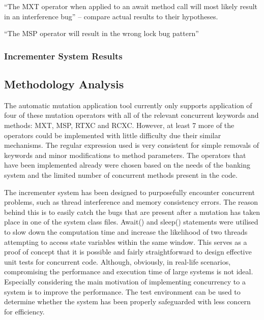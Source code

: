 \documentclass[a4paper,12pt]{article}
\begin{document}
“The MXT operator when applied to an await method call will most likely result in an interference bug” – compare actual results to their hypotheses.

“The MSP operator will result in the wrong lock bug pattern”





\subsubsection{Incrementer System Results} \label{section:Incrementer System Results} 
    
    
    
\subsection{Methodology Analysis}

The automatic mutation application tool currently only supports application of four of these mutation operators with all of the relevant concurrent keywords and methods: MXT, MSP, RTXC and RCXC. However, at least 7 more of the operators could be implemented with little difficulty due their similar mechanisms. The regular expression used is very consistent for simple removals of keywords and minor modifications to method parameters. The operators that have been implemented already were chosen based on the needs of the banking system and the limited number of concurrent methods present in the code.   

The incrementer system has been designed to purposefully encounter concurrent problems, such as thread interference and memory consistency errors. The reason behind this is to easily catch the bugs that are present after a mutation has taken place in one of the system class files. Await() and sleep() statements were utilised to slow down the computation time and increase the likelihood of two threads attempting to access state variables within the same window. This serves as a proof of concept that it is possible and fairly straightforward to design effective unit tests for concurrent code. Although, obviously, in real-life scenarios, compromising the performance and execution time of large systems is not ideal. Especially considering the main motivation of implementing concurrency to a system is to improve the performance. The test environment can be used to determine whether the system has been properly safeguarded with less concern for efficiency.
\end{document}
